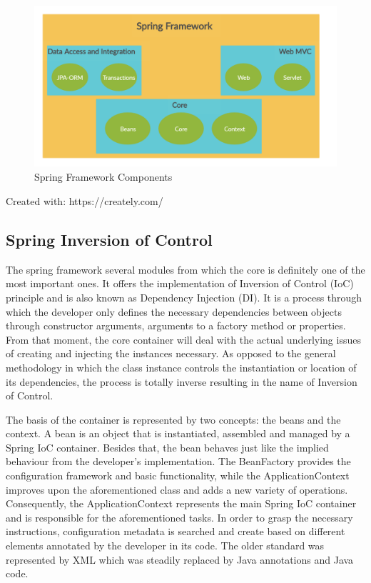 \begin{figure}[H]
\centering
\includegraphics[height=6cm]{images/SpringFramework.png} 
\caption{Spring Framework Components}
\label{fig:springframework}
\end{figure}
\begin{flushright}
Created with: https://creately.com/
\end{flushright}

\subsection*{Spring Inversion of Control}

The spring framework several modules from which the core is definitely one of the most important ones. It offers the implementation of Inversion of Control (IoC) principle and is also known as Dependency Injection (DI). It is a process through which the developer only defines the necessary dependencies between objects through constructor arguments, arguments to a factory method or properties. From that moment, the core container will deal with the actual underlying issues of creating and injecting the instances necessary. As opposed to the general methodology in which the class instance controls the instantiation or location of its dependencies, the process is totally inverse resulting in the name of Inversion of Control.

The basis of the container is represented by two concepts: the beans and the context. A bean is an object that is instantiated, assembled and managed by a Spring IoC container. Besides that, the bean behaves just like the implied behaviour from the developer's implementation. The BeanFactory provides the configuration framework and basic functionality, while the ApplicationContext improves upon the aforementioned class and adds a new variety of operations. Consequently, the ApplicationContext represents the main Spring IoC container and is responsible for the aforementioned tasks. In order to grasp the necessary instructions, configuration metadata is searched and create based on different elements annotated by the developer in its code. The older standard was represented by XML which was steadily replaced by Java annotations and Java code.

